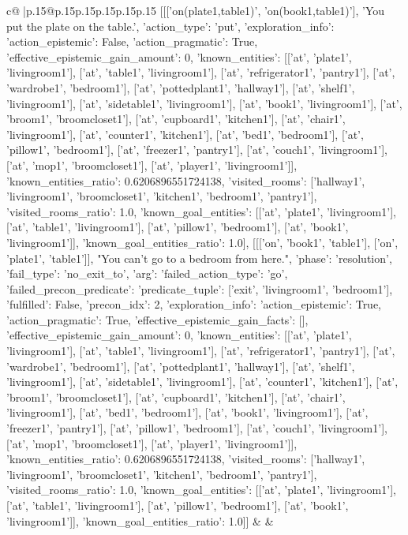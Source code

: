 \documentclass{article}
\begin{document}
{\begin{supertabular}{c@{$\;$}|p{.15\linewidth}@{}p{.15\linewidth}p{.15\linewidth}p{.15\linewidth}p{.15\linewidth}p{.15\linewidth}}
{{{	 [[['on(plate1,table1)', 'on(book1,table1)'], 'You put the plate on the table.', {'action_type': 'put', 'exploration_info': {'action_epistemic': False, 'action_pragmatic': True, 'effective_epistemic_gain_amount': 0, 'known_entities': [['at', 'plate1', 'livingroom1'], ['at', 'table1', 'livingroom1'], ['at', 'refrigerator1', 'pantry1'], ['at', 'wardrobe1', 'bedroom1'], ['at', 'pottedplant1', 'hallway1'], ['at', 'shelf1', 'livingroom1'], ['at', 'sidetable1', 'livingroom1'], ['at', 'book1', 'livingroom1'], ['at', 'broom1', 'broomcloset1'], ['at', 'cupboard1', 'kitchen1'], ['at', 'chair1', 'livingroom1'], ['at', 'counter1', 'kitchen1'], ['at', 'bed1', 'bedroom1'], ['at', 'pillow1', 'bedroom1'], ['at', 'freezer1', 'pantry1'], ['at', 'couch1', 'livingroom1'], ['at', 'mop1', 'broomcloset1'], ['at', 'player1', 'livingroom1']], 'known_entities_ratio': 0.6206896551724138, 'visited_rooms': ['hallway1', 'livingroom1', 'broomcloset1', 'kitchen1', 'bedroom1', 'pantry1'], 'visited_rooms_ratio': 1.0, 'known_goal_entities': [['at', 'plate1', 'livingroom1'], ['at', 'table1', 'livingroom1'], ['at', 'pillow1', 'bedroom1'], ['at', 'book1', 'livingroom1']], 'known_goal_entities_ratio': 1.0}}], [[['on', 'book1', 'table1'], ['on', 'plate1', 'table1']], "You can't go to a bedroom from here.", {'phase': 'resolution', 'fail_type': 'no_exit_to', 'arg': {'failed_action_type': 'go', 'failed_precon_predicate': {'predicate_tuple': ['exit', 'livingroom1', 'bedroom1'], 'fulfilled': False, 'precon_idx': 2}}, 'exploration_info': {'action_epistemic': True, 'action_pragmatic': True, 'effective_epistemic_gain_facts': [], 'effective_epistemic_gain_amount': 0, 'known_entities': [['at', 'plate1', 'livingroom1'], ['at', 'table1', 'livingroom1'], ['at', 'refrigerator1', 'pantry1'], ['at', 'wardrobe1', 'bedroom1'], ['at', 'pottedplant1', 'hallway1'], ['at', 'shelf1', 'livingroom1'], ['at', 'sidetable1', 'livingroom1'], ['at', 'counter1', 'kitchen1'], ['at', 'broom1', 'broomcloset1'], ['at', 'cupboard1', 'kitchen1'], ['at', 'chair1', 'livingroom1'], ['at', 'bed1', 'bedroom1'], ['at', 'book1', 'livingroom1'], ['at', 'freezer1', 'pantry1'], ['at', 'pillow1', 'bedroom1'], ['at', 'couch1', 'livingroom1'], ['at', 'mop1', 'broomcloset1'], ['at', 'player1', 'livingroom1']], 'known_entities_ratio': 0.6206896551724138, 'visited_rooms': ['hallway1', 'livingroom1', 'broomcloset1', 'kitchen1', 'bedroom1', 'pantry1'], 'visited_rooms_ratio': 1.0, 'known_goal_entities': [['at', 'plate1', 'livingroom1'], ['at', 'table1', 'livingroom1'], ['at', 'pillow1', 'bedroom1'], ['at', 'book1', 'livingroom1']], 'known_goal_entities_ratio': 1.0}}]] 
	  } 
	   } 
	   } 
	 & & \\ 
 


\end{supertabular}}
\end{document}
